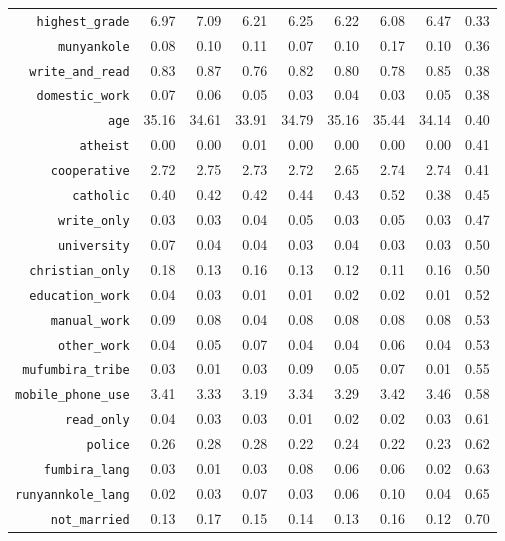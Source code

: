 \begin{longtable}{rrrrrrrrr}
  {\texttt{highest\_grade}} & 6.97 & 7.09 & 6.21 & 6.25 & 6.22 & 6.08 & 6.47 & 0.33 \\ 
  {\texttt{munyankole}} & 0.08 & 0.10 & 0.11 & 0.07 & 0.10 & 0.17 & 0.10 & 0.36 \\ 
  {\texttt{write\_and\_read}} & 0.83 & 0.87 & 0.76 & 0.82 & 0.80 & 0.78 & 0.85 & 0.38 \\ 
  {\texttt{domestic\_work}} & 0.07 & 0.06 & 0.05 & 0.03 & 0.04 & 0.03 & 0.05 & 0.38 \\ 
  {\texttt{age}} & 35.16 & 34.61 & 33.91 & 34.79 & 35.16 & 35.44 & 34.14 & 0.40 \\ 
  {\texttt{atheist}} & 0.00 & 0.00 & 0.01 & 0.00 & 0.00 & 0.00 & 0.00 & 0.41 \\ 
  {\texttt{cooperative}} & 2.72 & 2.75 & 2.73 & 2.72 & 2.65 & 2.74 & 2.74 & 0.41 \\ 
  {\texttt{catholic}} & 0.40 & 0.42 & 0.42 & 0.44 & 0.43 & 0.52 & 0.38 & 0.45 \\ 
  {\texttt{write\_only}} & 0.03 & 0.03 & 0.04 & 0.05 & 0.03 & 0.05 & 0.03 & 0.47 \\ 
  {\texttt{university}} & 0.07 & 0.04 & 0.04 & 0.03 & 0.04 & 0.03 & 0.03 & 0.50 \\ 
  {\texttt{christian\_only}} & 0.18 & 0.13 & 0.16 & 0.13 & 0.12 & 0.11 & 0.16 & 0.50 \\ 
  {\texttt{education\_work}} & 0.04 & 0.03 & 0.01 & 0.01 & 0.02 & 0.02 & 0.01 & 0.52 \\ 
  {\texttt{manual\_work}} & 0.09 & 0.08 & 0.04 & 0.08 & 0.08 & 0.08 & 0.08 & 0.53 \\ 
  {\texttt{other\_work}} & 0.04 & 0.05 & 0.07 & 0.04 & 0.04 & 0.06 & 0.04 & 0.53 \\ 
  {\texttt{mufumbira\_tribe}} & 0.03 & 0.01 & 0.03 & 0.09 & 0.05 & 0.07 & 0.01 & 0.55 \\ 
  {\texttt{mobile\_phone\_use}} & 3.41 & 3.33 & 3.19 & 3.34 & 3.29 & 3.42 & 3.46 & 0.58 \\ 
  {\texttt{read\_only}} & 0.04 & 0.03 & 0.03 & 0.01 & 0.02 & 0.02 & 0.03 & 0.61 \\ 
  {\texttt{police}} & 0.26 & 0.28 & 0.28 & 0.22 & 0.24 & 0.22 & 0.23 & 0.62 \\ 
  {\texttt{fumbira\_lang}} & 0.03 & 0.01 & 0.03 & 0.08 & 0.06 & 0.06 & 0.02 & 0.63 \\ 
  {\texttt{runyannkole\_lang}} & 0.02 & 0.03 & 0.07 & 0.03 & 0.06 & 0.10 & 0.04 & 0.65 \\ 
  {\texttt{not\_married}} & 0.13 & 0.17 & 0.15 & 0.14 & 0.13 & 0.16 & 0.12 & 0.70 \\ 

\end{longtable}
